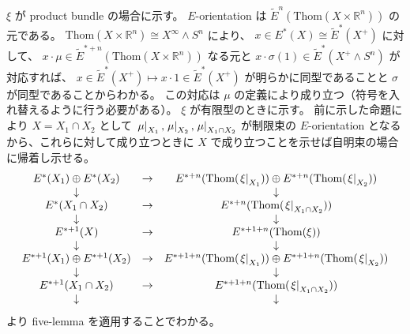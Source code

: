 \documentclass[dvipdfmx]{jsarticle}
\begin{document}
\begin{Proof}
\itemprof
  \(\xi\) が product bundle の場合に示す。
  \(E\)-orientation は \(\tilde{E}^n(\text{Thom}(X \times \mathbb{R}^n))\) の元である。
  \(\text{Thom}(X \times \mathbb{R}^n) \cong X^\infty \wedge S^n\) により、 \(x \in E^{*}(X) \cong \tilde{E}^{*}(X^+)\) に対して、 \(x \cdot \mu \in \tilde{E}^{*+n}(\text{Thom}(X \times \mathbb{R}^n))\) なる元と \(x \cdot \sigma(1) \in \tilde{E}^{*}(X^+ \wedge S^n)\) が対応すれば、 \(x \in \tilde{E}^{*}(X^+) \mapsto x \cdot 1 \in \tilde{E}^{*}(X^+)\) が明らかに同型であることと \(\sigma\) が同型であることからわかる。
  この対応は \(\mu\) の定義により成り立つ（符号を入れ替えるように行う必要がある）。
\itemprof
  \(\xi\) が有限型のときに示す。
  前に示した命題により \(X=X_1 \cap X_2\) として \(\left. {\mu} \right| _{X_1} , \left. {\mu} \right| _{X_2} , \left. {\mu} \right| _{X_1 \cap X_2}\) が制限束の \(E\)-orientation となるから、これらに対して成り立つときに \(X\) で成り立つことを示せば自明束の場合に帰着し示せる。
  \[\begin{matrix}
    E^{*}(X_1) \oplus E^{*}(X_2) & \to & E^{*+n}(\text{Thom}(\left. {\xi} \right| _{X_1})) \oplus E^{*+n}(\text{Thom}(\left. {\xi} \right| _{X_2})) \\
    \downarrow & & \downarrow \\
    E^{*}(X_1 \cap X_2) & \to & E^{*+n}(\text{Thom}(\left. {\xi} \right| _{X_1 \cap X_2})) \\
    \downarrow & & \downarrow \\
    E^{*+1}(X) & \to & E^{*+1+n}(\text{Thom}(\xi)) \\
    \downarrow & & \downarrow \\
    E^{*+1}(X_1) \oplus E^{*+1}(X_2) & \to & E^{*+1+n}(\text{Thom}(\left. {\xi} \right| _{X_1})) \oplus E^{*+1+n}(\text{Thom}(\left. {\xi} \right| _{X_2})) \\
    \downarrow & & \downarrow \\
    E^{*+1}(X_1 \cap X_2) & \to & E^{*+1+n}(\text{Thom}(\left. {\xi} \right| _{X_1 \cap X_2})) \\
    \downarrow & & \downarrow \\
  \end{matrix}\]
  より five-lemma を適用することでわかる。
\end{Proof}
\end{document}

